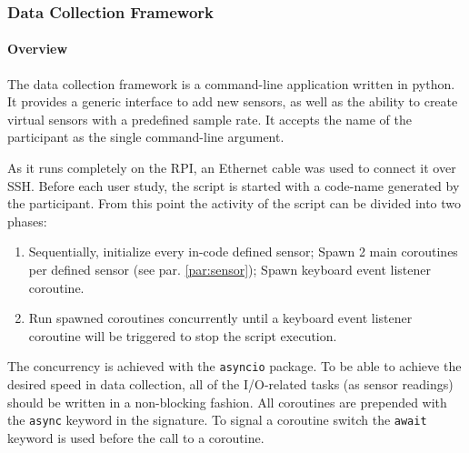 \subsubsection{Data Collection Framework}
\label{subsub:collector}

\paragraph{Overview}

The data collection framework is a command-line application written in python. It provides a generic interface to add new sensors, as well as the ability to create virtual sensors with a predefined sample rate. It accepts the name of the participant as the single command-line argument. 

As it runs completely on the RPI, an Ethernet cable was used to connect it over SSH. Before each user study, the script is started with a code-name generated by the participant. From this point the activity of the script can be divided into two phases:
\begin{enumerate}
    \item Sequentially, initialize every in-code defined sensor; Spawn 2 main coroutines per defined sensor (see par. \ref{par:sensor}); Spawn keyboard event listener coroutine.
    \item Run spawned coroutines concurrently until a keyboard event listener coroutine will be triggered to stop the script execution.
\end{enumerate}

The concurrency is achieved with the \texttt{asyncio} package. To be able to achieve the desired speed in data collection, all of the I/O-related tasks (as sensor readings) should be written in a non-blocking fashion. All coroutines are prepended with the \texttt{async} keyword in the signature. To signal a coroutine switch the \texttt{await} keyword is used before the call to a coroutine.


